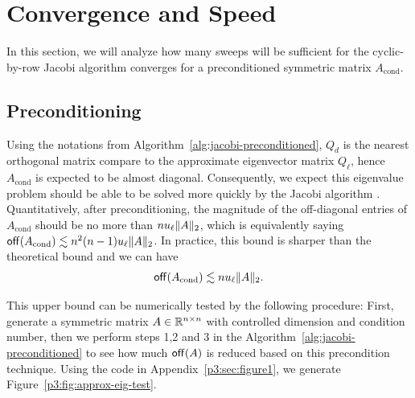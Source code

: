 \section{Convergence and Speed}

In this section, we will analyze how many sweeps will be sufficient for the cyclic-by-row Jacobi algorithm converges for a preconditioned symmetric matrix $A_{\text{cond}}$.

\subsection{Preconditioning}\label{p3:sec:precondition}

Using the notations from Algorithm~\ref{alg:jacobi-preconditioned}, $Q_d$ is the nearest orthogonal matrix compare to the approximate eigenvector matrix $Q_\ell$, hence $A_{\text{cond}}$ is expected to be almost diagonal. Consequently, we expect this eigenvalue problem should be able to be solved more quickly by the Jacobi algorithm . Quantitatively, after preconditioning, the magnitude of the off-diagonal entries of $A_\text{cond}$ should be no more than $nu_\ell \|{A}\|_2$, which is equivalently saying $\mathsf{off}(A_\text{cond}) \lesssim n^2(n-1)u_\ell \|{A}\|_2$. In practice, this bound is sharper than the theoretical bound and we can have 
\begin{equation}\label{p3:eq:offAbound}
  \mathsf{off}(A_\text{cond}) \lesssim nu_\ell \|{A}\|_2.
\end{equation}

This upper bound can be numerically tested by the following procedure: First, generate a symmetric matrix $A\in\mathbb{R}^{n\times n}$ with controlled dimension and condition number, then we perform steps 1,2 and 3 in the Algorithm~\ref{alg:jacobi-preconditioned} to see how much $\mathsf{off}(A)$ is reduced based on this precondition technique. Using the code in Appendix~\ref{p3:sec:figure1}, we generate Figure~\ref{p3:fig:approx-eig-test}.

